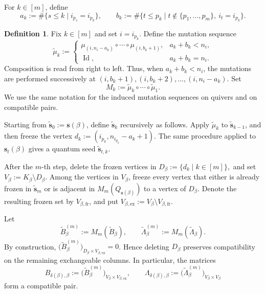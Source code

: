 \documentclass[12pt, reqno]{amsart}
\theoremstyle{plain}
\theoremstyle{definition}
\newtheorem{definition}[theorem]{Definition}
\numberwithin{equation}{section}
\begin{document}
For \(k\in[m]\), define
\[    a_k
    :=\#\{s\leq k\mid i_{p_s}=i_{p_k}\},
    \qquad
    b_k
    :=\#\bigl\{t\leq p_k
        \mid t\notin\{p_1,\ldots,p_m\},\ i_t=i_{p_k}\bigr\}.
\]

\begin{definition}\label{def:svbeta}
    Fix \(k\in[m]\) and set \(i=i_{p_k}\). Define the mutation
    sequence
    \begin{equation}\label{eq:mu-tilde-k}
        \widetilde\mu_k
        :=\begin{cases}
            \mu_{(i,n_i-a_k)}\circ\cdots\circ
            \mu_{(i,b_k+1)},
            & a_k+b_k<n_i,\\[1mm]
            \operatorname{Id},
            & a_k+b_k=n_i.
        \end{cases}
    \end{equation}
    Composition is read from right to left. Thus, when
    \(a_k+b_k<n_i\), the mutations are performed successively at
    \((i,b_k+1),(i,b_k+2),\ldots,(i,n_i-a_k)\). Set
    \begin{equation}\label{eq:M-k}
        M_k:=\widetilde\mu_k\circ\cdots\circ\widetilde\mu_1.
    \end{equation}
    We use the same notation for the induced mutation sequences on quivers
    and on compatible pairs.

    Starting from \(\widetilde{\mathbf s}_0:=\mathbf s(\beta)\), define
    \(\widetilde{\mathbf s}_k\) recursively as follows. Apply
    \(\widetilde\mu_k\) to \(\widetilde{\mathbf s}_{k-1}\), and then
    freeze the vertex
    \(
        d_k:=(i_{p_k},n_{i_{p_k}}-a_k+1).
    \)
    The same procedure applied to \(\mathbf s_t(\beta)\) gives a quantum
    seed \(\widetilde{\mathbf s}_{t,k}\).

    After the \(m\)-th step, delete the frozen vertices in
    \(
        D_\beta:=\{d_k\mid k\in[m]\},
    \)
    and set \(V_\beta:=K_\beta\setminus D_\beta\). Among the vertices in
    \(V_\beta\), freeze every vertex that either is already frozen in
    \(\widetilde{\mathbf s}_m\) or is adjacent in
    \(M_m(Q_{\mathbf s(\beta)})\) to a vertex of \(D_\beta\). Denote
    the resulting frozen set by \(V_{\beta,\mathrm{fr}}\), and put
    \(V_{\beta,\mathrm{ex}}
    :=V_\beta\setminus V_{\beta,\mathrm{fr}}\).

    Let
    \[
        \widetilde B_\beta^{(m)}
        :=M_m(\widetilde B_\beta),
        \qquad
        \widetilde\Lambda_\beta^{(m)}
        :=M_m(\widetilde\Lambda_\beta).
    \]
    By construction,
    \(\bigl(\widetilde B_\beta^{(m)}\bigr)_{
       D_\beta\times V_{\beta,\mathrm{ex}}}=0\). Hence deleting
    \(D_\beta\) preserves compatibility on the remaining exchangeable
    columns. In particular, the matrices
    \begin{equation}\label{eq:restricted-compatible-pair}
        B_{\delta(\beta),\beta}
        :=\bigl(\widetilde B_\beta^{(m)}\bigr)_{
            V_\beta\times V_{\beta,\mathrm{ex}}},
        \qquad
        \Lambda_{\delta(\beta),\beta}
        :=\bigl(\widetilde\Lambda_\beta^{(m)}\bigr)_{
            V_\beta\times V_\beta}
    \end{equation}
    form a compatible pair.


\end{definition}
\end{document}
